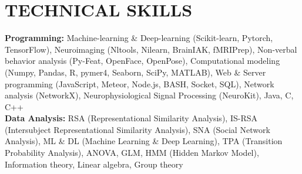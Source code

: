 \documentclass[a4paper,12pt]{article}
\newcommand{\itemspace}{7pt} %
\begin{document}
\vspace{7pt}

\section*{TECHNICAL SKILLS}
\textbf{Programming:} Machine-learning \& Deep-learning (Scikit-learn, Pytorch, TensorFlow), Neuroimaging (Nltools, Nilearn, BrainIAK, fMRIPrep), Non-verbal behavior analysis (Py-Feat, OpenFace, OpenPose), Computational modeling (Numpy, Pandas, R, pymer4, Seaborn, SciPy, MATLAB), Web \& Server programming (JavaScript, Meteor, Node.js, BASH, Socket, SQL), Network analysis (NetworkX), Neurophysiological Signal Processing (NeuroKit), Java, C, C++ \\[\itemspace]
\noindent\textbf{Data Analysis:} RSA (Representational Similarity Analysis), IS-RSA (Intersubject Representational Similarity Analysis), SNA (Social Network Analysis), ML \& DL (Machine Learning \& Deep Learning), TPA (Transition Probability Analysis), ANOVA, GLM, HMM (Hidden Markov Model), Information theory, Linear algebra, Group theory

\thispagestyle{lastupdate}
\end{document}
